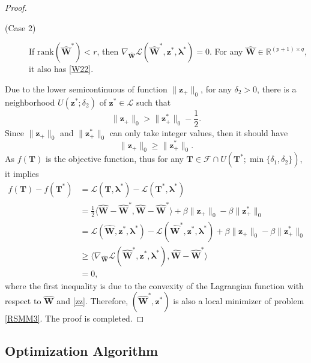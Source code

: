 \documentclass[sn-mathphys]{JORSC-jnl}%
\theoremstyle{thmstyleone}%
\theoremstyle{thmstylethree}%
\theoremstyle{thmstyleone} %
\begin{document}
\begin{proof}
\begin{description}
\item[(Case 2)] If $\text{rank}(\hat{\mathbf{W}}^*)<r$, then $\nabla_{\hat{\mathbf{W}}} \mathscr{L}(\hat{\mathbf{W}}^{*},\mathbf{z}^*,\bm{\lambda}^{*})=0$. For any $\hat{\mathbf{W}}\in\mathbb{R}^{(p+1)\times q}$, it also has \eqref{W22}.
\end{description}
Due to the lower semicontinuous of function $\|{\mathbf{z}}_+\|_0$, for any $\delta_2>0$, there is a neighborhood $U(\mathbf{z}^{*};\delta_{2})$  of $\mathbf{z}^{*}\in\mathcal{L}$  such that
 $$\|{\mathbf{z}}_+\|_0>\|{\mathbf{z}}^*_+\|_0-\dfrac{1}{2}.$$ Since $\|{\mathbf{z}}_+\|_0$ and $\|{\mathbf{z}}^*_+\|_0$ can only take integer values, then it should have 
 \begin{equation}\label{zz}\|{\mathbf{z}}_+\|_0\geq\|{\mathbf{z}}^*_+\|_0 .\end{equation}
As $f(\mathbf{T})$ is the objective function, thus for any $\mathbf{T}\in\mathcal{F}\cap U\left(\mathbf{T}^{*};\min\{\delta_{1},\delta_{2}\}\right)$, it implies
	$$
\begin{aligned}f(\mathbf{T})-f(\mathbf{T}^{*})&=\mathscr{L}(\mathbf{T},\bm{\lambda}^{*})-\mathscr{L}(\mathbf{T}^{*},\bm{\lambda}^{*})\\
&=\frac{1}{2}\langle\hat{\mathbf{W}}-\hat{\mathbf{W}}^*,\hat{\mathbf{W}}-\hat{\mathbf{W}}^*\rangle+\beta\|{\mathbf{z}}_+\|_0-\beta\|{\mathbf{z}}^*_+\|_0\\
&=\mathscr{L}(\hat{\mathbf{W}},\mathbf{z}^*,\bm{\lambda}^{*})-\mathscr{L}(\hat{\mathbf{W}}^{*},\mathbf{z}^*,\bm{\lambda}^{*})+\beta \|{\mathbf{z}}_+\|_0 -\beta\|{\mathbf{z}}^*_+\|_0\\
&\geq\langle\nabla_{\hat{\mathbf{W}}} \mathscr{L}(\hat{\mathbf{W}}^{*},\mathbf{z}^*,\bm{\lambda}^{*}),\hat{\mathbf{W}}-\hat{\mathbf{W}}^{*}\rangle\\&=0,\end{aligned}$$
where the first inequality is due to the convexity of the Lagrangian function with respect to $\hat{\mathbf{W}}$ and \eqref{zz}. Therefore, $(\hat{\mathbf{W}}^*,\mathbf{z}^*)$  is also a local minimizer of problem \eqref{RSMM3}. The proof is completed. 
\end{proof}



\subsection{Optimization Algorithm}
\end{document}
